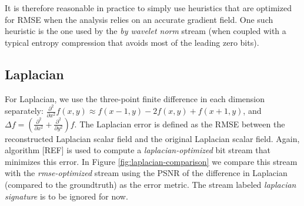 It is therefore reasonable in practice to simply use heuristics that are optimized for RMSE when the
analysis relies on an accurate gradient field. One such heuristic is the one used by the \emph{by
wavelet norm} stream (when coupled with a typical entropy compression that avoids most of the
leading zero bits).

\subsection{Laplacian}

For Laplacian, we use the three-point finite difference in each dimension separately:
$\frac{{\partial}^2}{\partial{x^2}}f(x,y) \approx f(x-1,y)-2f(x,y)+f(x+1,y)$, and $\Delta
f=(\frac{{\partial}^2}{\partial{x^2}}+\frac{{\partial}^2}{\partial{y^2}})f$. The Laplacian error is
defined as the RMSE between the reconstructed Laplacian scalar field and the original Laplacian
scalar field. Again, algorithm [REF] is used to compute a \emph{laplacian-optimized} bit stream that
minimizes this error. In Figure \ref{fig:laplacian-comparison} we compare this stream with the
\emph{rmse-optimized} stream using the PSNR of the difference in Laplacian (compared to the
groundtruth) as the error metric. The stream labeled \emph{laplacian signature} is to be ignored for
now.


